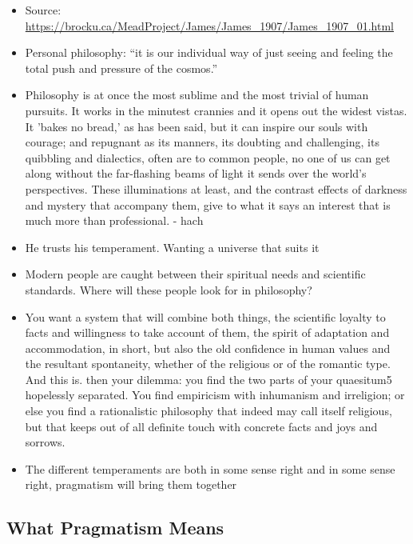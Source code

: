 \documentclass[emulatestandardclasses]{scrartcl}
\begin{document}
\begin{itemize}
  \item Source: \url{https://brocku.ca/MeadProject/James/James_1907/James_1907_01.html}
  \item Personal philosophy: "`it is our individual way of just seeing and feeling the total push and pressure of the cosmos."'
  \item Philosophy is at once the most sublime and the most trivial of human pursuits. It works in the minutest crannies and it opens out the widest vistas. It 'bakes no bread,' as has been said, but it can inspire our souls with courage; and repugnant as its manners, its doubting and challenging, its quibbling and dialectics, often are to common people, no one of us can get along without the far-flashing beams of light it sends over the world's perspectives. These illuminations at least, and the contrast effects of darkness and mystery that accompany them, give to what it says an interest that is much more than professional. - hach
  \item He trusts his temperament. Wanting a universe that suits it
  \item Modern people are caught between their spiritual needs and scientific standards. Where will these people look for in philosophy?
  \item You want a system that will combine both things, the scientific loyalty to facts and willingness to take account of them, the spirit of adaptation and accommodation, in short, but also the old confidence in human values and the resultant spontaneity, whether of the religious or of the romantic type. And this is. then your dilemma: you find the two parts of your quaesitum5 hopelessly separated. You find empiricism with inhumanism and irreligion; or else you find a rationalistic philosophy that indeed may call itself religious, but that keeps out of all definite touch with concrete facts and joys and sorrows.
  \item The different temperaments are both in some sense right and in some sense right, pragmatism will bring them together
\end{itemize}

\subsection{What Pragmatism Means}
\end{document}
